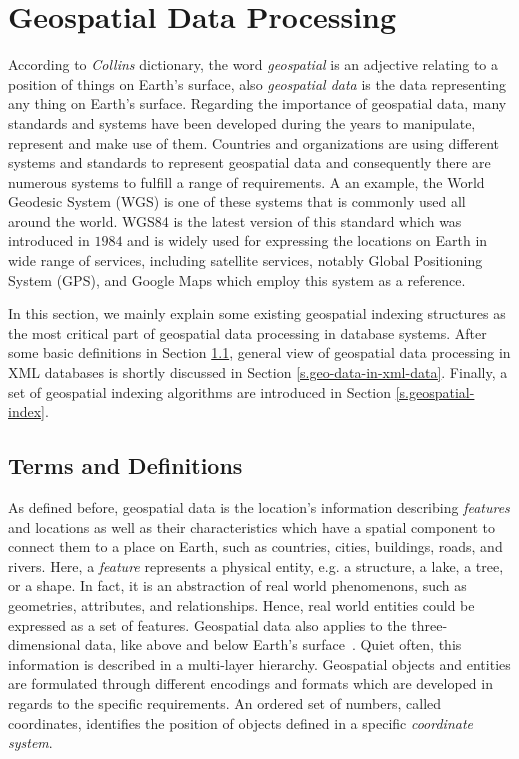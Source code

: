 \documentclass[a4paper,12pt]{article}
\begin{document}
\section{Geospatial Data Processing}
\label{s.method}
According to \emph{Collins} dictionary, the word \emph{geospatial} is an adjective relating to a position of things on Earth's surface, also \emph{geospatial data} is the data representing any thing on Earth's surface. Regarding the importance of geospatial data, many standards and systems have been developed  during the years to manipulate, represent and make use of them. Countries and organizations are using different systems and standards to represent geospatial data and consequently there are numerous systems to fulfill a range of requirements. A an example, the World Geodesic System (WGS) is one of these systems that is commonly used all around the world. WGS84 is the latest version of this standard which
was introduced in $1984$ and is widely used for expressing the locations on Earth in wide range of services, including satellite services, notably Global Positioning System (GPS), and Google Maps which employ this system as a reference.

In this section, we mainly explain some existing geospatial indexing structures as the most critical part of geospatial data processing in database systems. After some basic definitions in Section \ref{termsanddef}, general view of geospatial data processing in XML databases is shortly discussed in Section \ref{s.geo-data-in-xml-data}.
Finally, a set of geospatial indexing algorithms are introduced in Section \ref{s.geospatial-index}.

\subsection{Terms and Definitions}
\label{termsanddef}
As defined before, geospatial data is the location's information describing \textit{features} and locations as well as their characteristics which have a spatial component to connect them to a place on Earth, such as countries, cities, buildings, roads, and rivers. Here, a \textit{feature} represents a physical entity, e.g. a structure, a lake, a tree, or a shape. In fact, it is an abstraction of real world phenomenons, such as geometries, attributes, and relationships. Hence, real world entities could be expressed as a set of features.
Geospatial data also applies to the three-dimensional data, like above and below Earth's surface~\cite{powell}. Quiet often, this information is described in a multi-layer hierarchy. Geospatial objects and entities are formulated through different encodings and formats which are developed in regards to the specific requirements. An ordered set of numbers, called coordinates, identifies the position of objects  defined in a specific \textit{coordinate system}. 
\end{document}

